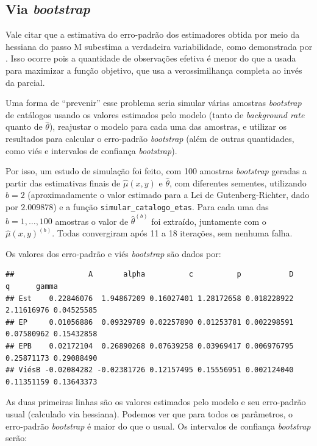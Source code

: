\documentclass[11pt,]{article}
\begin{document}
\hypertarget{via-bootstrap}{%
\subsection{\texorpdfstring{Via
\emph{bootstrap}}{Via bootstrap}}\label{via-bootstrap}}

Vale citar que a estimativa do erro-padrão dos estimadores obtida por
meio da hessiana do passo M subestima a verdadeira variabilidade, como
demonstrada por \cite{Louis_1982}. Isso ocorre pois a quantidade de
observações efetiva é menor do que a usada para maximizar a função
objetivo, que usa a verossimilhança completa ao invés da parcial.

Uma forma de ``prevenir'' esse problema seria simular várias amostras
\emph{bootstrap} de catálogos usando os valores estimados pelo modelo
(tanto de \emph{background rate} quanto de \(\hat{\theta}\)), reajustar
o modelo para cada uma das amostras, e utilizar os resultados para
calcular o erro-padrão \emph{bootstrap} (além de outras quantidades,
como viés e intervalos de confiança \emph{bootstrap}).

Por isso, um estudo de simulação foi feito, com 100 amostras
\emph{bootstrap} geradas a partir das estimativas finais de
\(\hat\mu(x,y)\) e \(\hat{\theta}\), com diferentes sementes, utilizando
\(\hat{b} = 2\) (aproximadamente o valor estimado para a Lei de
Gutenberg-Richter, dado por \(2.009878\)) e a função
\texttt{simular_catalogo_etas}. Para cada uma das \(b = 1,\ldots,100\)
amostras o valor de \(\hat{\theta}^{(b)}\) foi extraído, juntamente com
o \(\hat{\mu}(x,y)^{(b)}\). Todas convergiram após 11 a 18 iterações,
sem nenhuma falha.

Os valores dos erro-padrão e viés \emph{bootstrap} são dados por:

\begin{verbatim}
##                 A       alpha          c          p           D          q      gamma
## Est    0.22846076  1.94867209 0.16027401 1.28172658 0.018228922 2.11616976 0.04525585
## EP     0.01056886  0.09329789 0.02257890 0.01253781 0.002298591 0.07580962 0.15432858
## EPB    0.02172104  0.26890268 0.07639258 0.03969417 0.006976795 0.25871173 0.29088490
## ViésB -0.02084282 -0.02381726 0.12157495 0.15556951 0.002124040 0.11351159 0.13643373
\end{verbatim}

As duas primeiras linhas são os valores estimados pelo modelo e seu
erro-padrão usual (calculado via hessiana). Podemos ver que para todos
os parâmetros, o erro-padrão \emph{bootstrap} é maior do que o usual. Os
intervalos de confiança \emph{bootstrap} serão:
\end{document}
